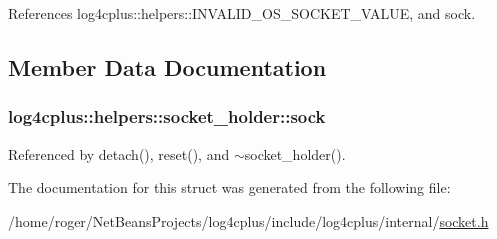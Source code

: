 References log4cplus\-::helpers\-::\-I\-N\-V\-A\-L\-I\-D\-\_\-\-O\-S\-\_\-\-S\-O\-C\-K\-E\-T\-\_\-\-V\-A\-L\-U\-E, and sock.



\subsection{Member Data Documentation}
\hypertarget{structlog4cplus_1_1helpers_1_1socket__holder_a6da3b60d7c2f38f947e2d8461f30702e}{
\subsubsection[{sock}]{ log4cplus\-::helpers\-::socket\-\_\-holder\-::sock}}\label{structlog4cplus_1_1helpers_1_1socket__holder_a6da3b60d7c2f38f947e2d8461f30702e}


Referenced by detach(), reset(), and $\sim$socket\-\_\-holder().



The documentation for this struct was generated from the following file\-:\begin{DoxyCompactItemize}
\item 
/home/roger/\-Net\-Beans\-Projects/log4cplus/include/log4cplus/internal/\hyperlink{internal_2socket_8h}{socket.\-h}\end{DoxyCompactItemize}
